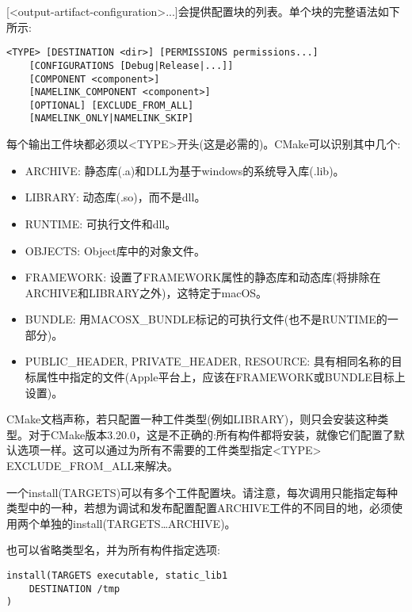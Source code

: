 [<output-artifact-configuration>...]会提供配置块的列表。单个块的完整语法如下所示:

\begin{lstlisting}[style=styleCMake]
<TYPE> [DESTINATION <dir>] [PERMISSIONS permissions...]
	[CONFIGURATIONS [Debug|Release|...]]
	[COMPONENT <component>]
	[NAMELINK_COMPONENT <component>]
	[OPTIONAL] [EXCLUDE_FROM_ALL]
	[NAMELINK_ONLY|NAMELINK_SKIP]
\end{lstlisting}

每个输出工件块都必须以<TYPE>开头(这是必需的)。CMake可以识别其中几个:

\begin{itemize}
\item 
ARCHIVE: 静态库(.a)和DLL为基于windows的系统导入库(.lib)。

\item 
LIBRARY: 动态库(.so)，而不是dll。

\item 
RUNTIME: 可执行文件和dll。

\item 
OBJECTS: Object库中的对象文件。

\item 
FRAMEWORK: 设置了FRAMEWORK属性的静态库和动态库(将排除在ARCHIVE和LIBRARY之外)，这特定于macOS。

\item 
BUNDLE: 用MACOSX\_BUNDLE标记的可执行文件(也不是RUNTIME的一部分)。

\item 
PUBLIC\_HEADER, PRIVATE\_HEADER, RESOURCE: 具有相同名称的目标属性中指定的文件(Apple平台上，应该在FRAMEWORK或BUNDLE目标上设置)。
\end{itemize}

CMake文档声称，若只配置一种工件类型(例如LIBRARY)，则只会安装这种类型。对于CMake版本3.20.0，这是不正确的:所有构件都将安装，就像它们配置了默认选项一样。这可以通过为所有不需要的工件类型指定<TYPE> EXCLUDE\_FROM\_ALL来解决。

\begin{tcolorbox}[colback=blue!5!white,colframe=blue!75!black,title=Note]
一个install(TARGETS)可以有多个工件配置块。请注意，每次调用只能指定每种类型中的一种，若想为调试和发布配置配置ARCHIVE工件的不同目的地，必须使用两个单独的install(TARGETS…ARCHIVE)。
\end{tcolorbox}

也可以省略类型名，并为所有构件指定选项:

\begin{lstlisting}[style=styleCMake]
install(TARGETS executable, static_lib1
	DESTINATION /tmp
)
\end{lstlisting}

